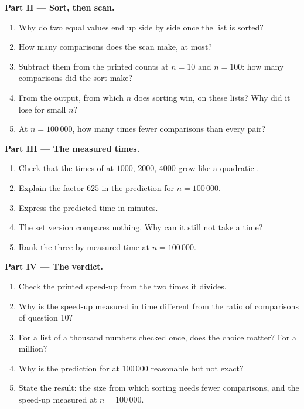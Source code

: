 \begin{problem}
\medskip\noindent\textbf{Part II --- Sort, then scan.}
\begin{enumerate}[resume]
  \item Why do two equal values end up side by side once the list is sorted?
  \item How many comparisons does the scan make, at most?
  \item Subtract them from the printed counts at $n = 10$ and $n = 100$: how many comparisons did the sort make?
  \item From the output, from which $n$ does sorting win, on these lists? Why did it lose for small $n$?
  \item At $n = 100\,000$, how many times fewer comparisons than every pair?
\end{enumerate}

\medskip\noindent\textbf{Part III --- The measured times.}
\begin{enumerate}[resume]
  \item Check that the times of  at $1000$, $2000$, $4000$ grow like a quadratic .
  \item Explain the factor $625$ in the prediction for $n = 100\,000$.
  \item Express the predicted time in minutes.
  \item The set version compares nothing. Why can it still not take a  time?
  \item Rank the three by measured time at $n = 100\,000$.
\end{enumerate}

\medskip\noindent\textbf{Part IV --- The verdict.}
\begin{enumerate}[resume]
  \item Check the printed speed-up from the two times it divides.
  \item Why is the speed-up measured in time different from the ratio of comparisons of question 10?
  \item For a list of a thousand numbers checked once, does the choice matter? For a million?
  \item Why is the prediction for  at $100\,000$ reasonable but not exact?
  \item State the result: the size from which sorting needs fewer comparisons, and the speed-up measured at
    $n = 100\,000$.
\end{enumerate}
\end{problem}
